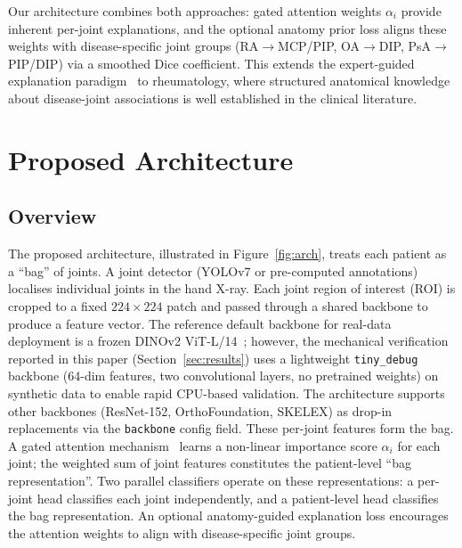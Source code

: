 \documentclass{article}
\begin{document}
Our architecture combines both approaches: gated attention weights $\alpha_i$ provide inherent per-joint explanations, and the optional anatomy prior loss aligns these weights with disease-specific joint groups (RA$\rightarrow$MCP/PIP, OA$\rightarrow$DIP, PsA$\rightarrow$PIP/DIP) via a smoothed Dice coefficient. This extends the expert-guided explanation paradigm~\cite{uddin2025} to rheumatology, where structured anatomical knowledge about disease-joint associations is well established in the clinical literature.

\section{Proposed Architecture}
\label{sec:method}

\subsection{Overview}

The proposed architecture, illustrated in Figure~\ref{fig:arch}, treats each patient as a ``bag'' of joints. A joint detector (YOLOv7 or pre-computed annotations) localises individual joints in the hand X-ray. Each joint region of interest (ROI) is cropped to a fixed $224\times224$ patch and passed through a shared backbone to produce a feature vector. The reference default backbone for real-data deployment is a frozen DINOv2 ViT-L/14~\cite{dinov22023}; however, the mechanical verification reported in this paper (Section~\ref{sec:results}) uses a lightweight \texttt{tiny\_debug} backbone (64-dim features, two convolutional layers, no pretrained weights) on synthetic data to enable rapid CPU-based validation. The architecture supports other backbones (ResNet-152, OrthoFoundation, SKELEX) as drop-in replacements via the \texttt{backbone} config field. These per-joint features form the bag. A gated attention mechanism~\cite{ilse2018} learns a non-linear importance score $\alpha_i$ for each joint; the weighted sum of joint features constitutes the patient-level ``bag representation''. Two parallel classifiers operate on these representations: a per-joint head classifies each joint independently, and a patient-level head classifies the bag representation. An optional anatomy-guided explanation loss encourages the attention weights to align with disease-specific joint groups.
\end{document}
